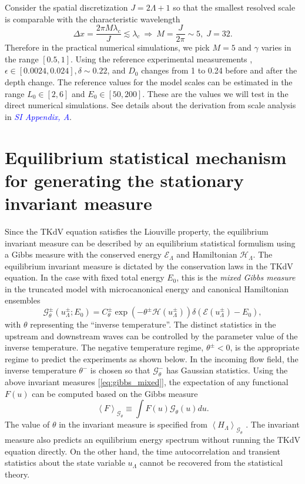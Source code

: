\documentclass[9pt,twocolumn,twoside,lineno]{pnas-new}
\begin{document}
Consider the spatial discretization $J=2\Lambda+1$ so that the smallest
resolved scale is comparable with the characteristic wavelength
\[
\Delta x=\frac{2\pi M\lambda_{c}}{J}\lesssim\lambda_{c}\:\Rightarrow\:M=\frac{J}{2\pi}\sim5,\;J=32.
\]
Therefore in the practical numerical simulations, we pick $M=5$ and
$\gamma$ varies in the range $\left[0.5,1\right]$. Using the reference
experimental measurements \cite{bolles2018anomalous}, $\epsilon\in\left[0.0024,0.024\right],\delta\sim0.22$,
and $D_{0}$ changes from 1 to 0.24 before and after the depth change.
The reference values for the model scales can be estimated in the
range $L_{0}\in\left[2,6\right]$ and $E_{0}\in\left[50,200\right]$.
These are the values we will test in the direct numerical simulations.
See details about the derivation from scale analysis in \textcolor{blue}{\emph{SI Appendix, A}}.

\section{Equilibrium statistical mechanism for generating the stationary invariant measure}

Since the TKdV equation satisfies the Liouville property, the equilibrium
invariant measure can be described by an equilibrium statistical formulism
\cite{abramov2003hamiltonian,majda2006nonlinear,bajars2013weakly}
using a Gibbs measure with the conserved energy $\mathcal{E}_{\Lambda}$ and
Hamiltonian $\mathcal{H}_{\Lambda}$. The equilibrium invariant measure is dictated
by the conservation laws in the TKdV equation. In the case with fixed
total energy $E_{0}$, this is the \emph{mixed Gibbs measure} in the
truncated model with microcanonical energy and canonical Hamiltonian
ensembles \cite{abramov2003hamiltonian}
\begin{equation}
\mathcal{G}_{\theta}^{\pm}\left(u_{\Lambda}^{\pm};E_{0}\right)=C_{\theta}^{\pm}\exp\left(-\theta^{\pm}\mathcal{H}\left(u_{\Lambda}^{\pm}\right)\right)\delta\left(\mathcal{E}\left(u_{\Lambda}^{\pm}\right)-E_{0}\right),\label{eq:gibbs_mixed}
\end{equation}
with $\theta$ representing the ``inverse temperature''. The distinct
statistics in the upstream and downstream waves can be controlled
by the parameter value of the inverse temperature. The negative temperature
regime, $\theta^{\pm}<0$, is the appropriate regime to predict the
experiments as shown below. In the incoming flow field, the inverse
temperature $\theta^{-}$ is chosen so that $\mathcal{G}_{\theta}^{-}$
has Gaussian statistics. Using the above invariant measures [\ref{eq:gibbs_mixed}],
the expectation of any functional $F\left(u\right)$ can be computed
based on the Gibbs measure 
\[
\left\langle F\right\rangle _{\mathcal{G}_{\theta}}\equiv\int F\left(u\right)\mathcal{G}_{\theta}\left(u\right)du.
\]
The value of $\theta$ in the invariant measure is specified from
$\left\langle H_{\Lambda}\right\rangle _{\mathcal{G}_{\theta}}$ \cite{abramov2003hamiltonian,bajars2013weakly}.
The invariant measure also predicts an equilibrium energy spectrum
without running the TKdV equation directly. On the other hand, the
time autocorrelation and transient statistics about the state variable
$u_{\Lambda}$ cannot be recovered from the statistical theory.
\end{document}
